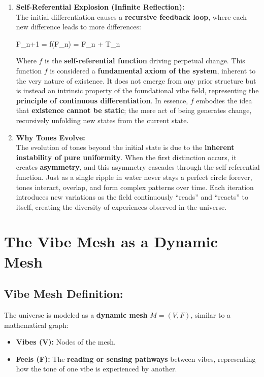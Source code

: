 \documentclass{article}
\let\oldequation\equation
\let\endoldequation\endequation
\renewenvironment{equation}{%
    \noindent\vspace{-\parskip}\vspace{-\baselineskip}%
    \oldequation
}{%
    \endoldequation
    \noindent\vspace{-\parskip}\vspace{-\baselineskip}%
}
\theoremstyle{definition}
\begin{document}
\begin{enumerate}
\item \textbf{Self-Referential Explosion (Infinite Reflection):}\\
The initial differentiation causes a \textbf{recursive feedback loop}, where each new difference leads to more differences:

\begin{equation}
F_{n+1} = f(F_n) = F_n + \Delta T_n
\end{equation}

Where $f$ is the \textbf{self-referential function} driving perpetual change. This function $f$ is considered a \textbf{fundamental axiom of the system}, inherent to the very nature of existence. It does not emerge from any prior structure but is instead an intrinsic property of the foundational vibe field, representing the \textbf{principle of continuous differentiation}. In essence, $f$ embodies the idea that \textbf{existence cannot be static}; the mere act of being generates change, recursively unfolding new states from the current state.

\item \textbf{Why Tones Evolve:}\\
The evolution of tones beyond the initial state is due to the \textbf{inherent instability of pure uniformity}. When the first distinction occurs, it creates \textbf{asymmetry}, and this asymmetry cascades through the self-referential function. Just as a single ripple in water never stays a perfect circle forever, tones interact, overlap, and form complex patterns over time. Each iteration introduces new variations as the field continuously \enquote{reads} and \enquote{reacts} to itself, creating the diversity of experiences observed in the universe.
\end{enumerate}

\section{The Vibe Mesh as a Dynamic Mesh}

\subsection{Vibe Mesh Definition:}

The universe is modeled as a \textbf{dynamic mesh} $M = (V, F)$, similar to a mathematical graph:

\begin{itemize}
\item \textbf{Vibes (V):} Nodes of the mesh.
\item \textbf{Feels (F):} The \textbf{reading or sensing pathways} between vibes, representing how the tone of one vibe is experienced by another.
\end{itemize}
\end{document}
